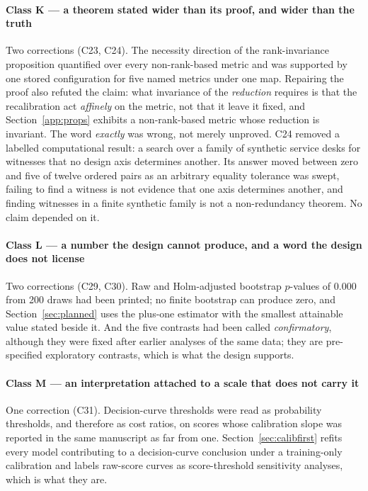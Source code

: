 \paragraph{Class K --- a theorem stated wider than its proof, and wider than
the truth}
Two corrections (C23, C24). The necessity direction of the rank-invariance
proposition quantified over every non-rank-based metric and was supported
by one stored configuration for five named metrics under one map. Repairing
the proof also refuted the claim: what invariance of the \emph{reduction}
requires is that the recalibration act \emph{affinely} on the metric, not
that it leave it fixed, and Section~\ref{app:props} exhibits a
non-rank-based metric whose reduction is invariant. The word
\emph{exactly} was wrong, not merely unproved. C24 removed a labelled
computational result: a search over a family of synthetic service desks for
witnesses that no design axis determines another. Its answer moved between
zero and five of twelve ordered pairs as an arbitrary equality tolerance was
swept, failing to find a witness is not evidence that one axis determines
another, and finding witnesses in a finite synthetic family is not a
non-redundancy theorem. No claim depended on it.

\paragraph{Class L --- a number the design cannot produce, and a word the
design does not license}
Two corrections (C29, C30). Raw and Holm-adjusted bootstrap $p$-values of
$0.000$ from 200 draws had been printed; no finite bootstrap can produce zero,
and Section~\ref{sec:planned} uses the plus-one estimator with the smallest
attainable value stated beside it. And the five contrasts had been called
\emph{confirmatory}, although they were fixed after earlier analyses of the
same data; they are pre-specified exploratory contrasts, which is what the
design supports.

\paragraph{Class M --- an interpretation attached to a scale that does not
carry it}
One correction (C31). Decision-curve thresholds were read as probability
thresholds, and therefore as cost ratios, on scores whose calibration slope
was reported in the same manuscript as far from one.
Section~\ref{sec:calibfirst} refits every model contributing to a
decision-curve conclusion under a training-only calibration and labels
raw-score curves as score-threshold sensitivity analyses, which is what they
are.

